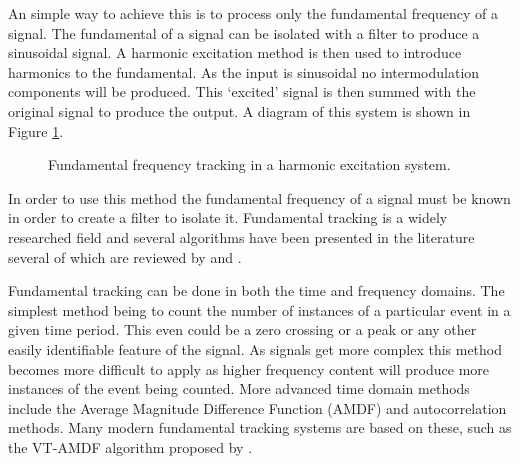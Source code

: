 		An simple way to achieve this is to process only the fundamental frequency of a signal. The fundamental of
		a signal can be isolated with a filter to produce a sinusoidal signal. A harmonic excitation method is then
		used to introduce harmonics to the fundamental. As the input is sinusoidal no intermodulation components
		will be produced. This `excited' signal is then summed with the original signal to produce the output. A
		diagram of this system is shown in Figure \ref{fig:F0Tracking}.

		\begin{figure}[h!]
			\centering
			\caption{Fundamental frequency tracking in a harmonic excitation system.}
			\label{fig:F0Tracking}
		\end{figure}


		In order to use this method the fundamental frequency of a signal must be known in order to create a filter
		to isolate it. Fundamental tracking is a widely researched field and several algorithms have been presented
		in the literature several of which are reviewed by \citet{cuadra2001efficient} and
		\citet{gerhard2003pitch}.

		Fundamental tracking can be done in both the time and frequency domains. The simplest method being to count
		the number of instances of a particular event in a given time period. This even could be a zero crossing or
		a peak or any other easily identifiable feature of the signal. As signals get more complex this method
		becomes more difficult to apply as higher frequency content will produce more instances of the event being
		counted. More advanced time domain methods include the Average Magnitude Difference Function (AMDF) and
		autocorrelation methods. Many modern fundamental tracking systems are based on these, such as the VT-AMDF
		algorithm proposed by \citet{prukkanon2009vt-amdf}.


